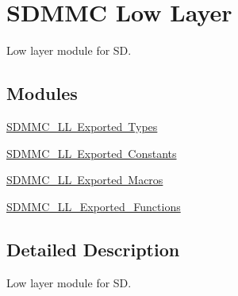 \hypertarget{group___s_d_m_m_c___l_l}{}\section{S\+D\+M\+MC Low Layer}
\label{group___s_d_m_m_c___l_l}


Low layer module for SD.  


\subsection*{Modules}
\begin{DoxyCompactItemize}
\item 
\mbox{\hyperlink{group___s_d_m_m_c___l_l___exported___types}{S\+D\+M\+M\+C\+\_\+\+L\+L Exported Types}}
\item 
\mbox{\hyperlink{group___s_d_m_m_c___l_l___exported___constants}{S\+D\+M\+M\+C\+\_\+\+L\+L Exported Constants}}
\item 
\mbox{\hyperlink{group___s_d_m_m_c___l_l___exported__macros}{S\+D\+M\+M\+C\+\_\+\+L\+L Exported Macros}}
\item 
\mbox{\hyperlink{group___s_d_m_m_c___l_l___exported___functions}{S\+D\+M\+M\+C\+\_\+\+L\+L\+\_\+\+Exported\+\_\+\+Functions}}
\end{DoxyCompactItemize}


\subsection{Detailed Description}
Low layer module for SD. 

